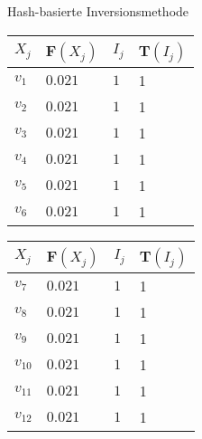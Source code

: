 \begin{frame}{Hash-basierte Inversionsmethode}
    \begin{table}%
        \centering
        \begin{tabular}{l|l|l|l}
            $X_j$   & F$(X_j)$  & $I_j$ & T$(I_j)$ \\
            \hline\hline %
            $v_1$   & $0.021$   & $1$   & 1 \\ 
            $v_2$   & $0.021$   & $1$   & 1 \\
            $v_3$   & $0.021$   & $1$   & 1 \\
            $v_4$   & $0.021$   & $1$   & 1 \\ 
            $v_5$   & $0.021$   & $1$   & 1 \\
            $v_6$   & $0.021$   & $1$   & 1
        \end{tabular}
        \hspace{2em}
        \begin{tabular}{l|l|l|l}
            $X_j$   & F$(X_j)$  & $I_j$ & T$(I_j)$ \\
            \hline\hline %
            $v_7$   & $0.021$   & $1$   & 1 \\ 
            $v_8$   & $0.021$   & $1$   & 1 \\
            $v_9$   & $0.021$   & $1$   & 1 \\
            $v_{10}$  & $0.021$   & $1$   & 1 \\ 
            $v_{11}$  & $0.021$   & $1$   & 1 \\
            $v_{12}$  & $0.021$   & $1$   & 1
        \end{tabular}
    \end{table}
\end{frame}